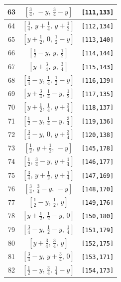\documentclass[fleqn,8pt]{jsarticle}
\begin{document}
\begin{longtable}{ccc}
63 & $\left[ \frac{3}{4},\, - y,\, \frac{3}{4} - y \right]$ & {\tt [111,133]} \\ \hline
64 & $\left[ \frac{3}{4},\, y + \frac{1}{4},\, y + \frac{1}{2} \right]$ & {\tt [112,134]} \\ \hline
65 & $\left[ y + \frac{1}{2},\, 0,\, \frac{1}{2} - y \right]$ & {\tt [113,140]} \\ \hline
66 & $\left[ \frac{1}{2} - y,\, y,\, \frac{1}{2} \right]$ & {\tt [114,144]} \\ \hline
67 & $\left[ y + \frac{3}{4},\, y,\, \frac{3}{4} \right]$ & {\tt [115,143]} \\ \hline
68 & $\left[ \frac{3}{4} - y,\, \frac{1}{4},\, \frac{1}{2} - y \right]$ & {\tt [116,139]} \\ \hline
69 & $\left[ y + \frac{3}{4},\, \frac{1}{4} - y,\, \frac{1}{2} \right]$ & {\tt [117,135]} \\ \hline
70 & $\left[ y + \frac{1}{2},\, \frac{1}{4},\, y + \frac{3}{4} \right]$ & {\tt [118,137]} \\ \hline
71 & $\left[ \frac{1}{2} - y,\, \frac{1}{4} - y,\, \frac{3}{4} \right]$ & {\tt [119,136]} \\ \hline
72 & $\left[ \frac{3}{4} - y,\, 0,\, y + \frac{3}{4} \right]$ & {\tt [120,138]} \\ \hline
73 & $\left[ \frac{1}{2},\, y + \frac{1}{2},\, - y \right]$ & {\tt [145,178]} \\ \hline
74 & $\left[ \frac{1}{2},\, \frac{3}{4} - y,\, y + \frac{1}{4} \right]$ & {\tt [146,177]} \\ \hline
75 & $\left[ \frac{3}{4},\, y + \frac{1}{2},\, y + \frac{1}{4} \right]$ & {\tt [147,169]} \\ \hline
76 & $\left[ \frac{3}{4},\, \frac{3}{4} - y,\, - y \right]$ & {\tt [148,170]} \\ \hline
77 & $\left[ \frac{1}{2} - y,\, \frac{1}{2},\, y \right]$ & {\tt [149,176]} \\ \hline
78 & $\left[ y + \frac{1}{2},\, \frac{1}{2} - y,\, 0 \right]$ & {\tt [150,180]} \\ \hline
79 & $\left[ \frac{3}{4} - y,\, \frac{1}{2} - y,\, \frac{1}{4} \right]$ & {\tt [151,179]} \\ \hline
80 & $\left[ y + \frac{3}{4},\, \frac{3}{4},\, y \right]$ & {\tt [152,175]} \\ \hline
81 & $\left[ \frac{3}{4} - y,\, y + \frac{3}{4},\, 0 \right]$ & {\tt [153,171]} \\ \hline
82 & $\left[ \frac{1}{2} - y,\, \frac{3}{4},\, \frac{1}{4} - y \right]$ & {\tt [154,173]} \\ \hline

\end{longtable}
\end{document}
